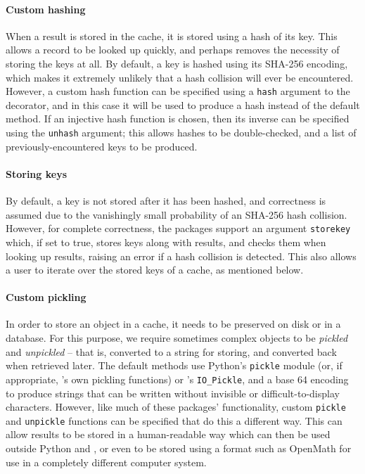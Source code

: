 \documentclass{deliverablereport}
\begin{document}
\paragraph{Custom hashing}
When a result is stored in the cache, it is stored using a hash of its key.
This allows a record to be looked up quickly, and perhaps removes the necessity
of storing the keys at all.  By default, a key is hashed using its SHA-256
encoding, which makes it extremely unlikely that a hash collision will ever be
encountered.  However, a custom hash function can be specified using a
\texttt{hash} argument to the decorator, and in this case it will be used to
produce a hash instead of the default method.  If an injective hash function is
chosen, then its inverse can be specified using the \texttt{unhash} argument;
this allows hashes to be double-checked, and a list of previously-encountered
keys to be produced.

\paragraph{Storing keys}
By default, a key is not stored after it has been hashed, and correctness is
assumed due to the vanishingly small probability of an SHA-256 hash collision.
However, for complete correctness, the packages support an argument
\texttt{storekey} which, if set to true, stores keys along with results, and
checks them when looking up results, raising an error if a hash collision is
detected.  This also allows a user to iterate over the stored keys of a cache,
as mentioned below.

\paragraph{Custom pickling}
In order to store an object in a cache, it needs to be preserved on disk or in a
database.  For this purpose, we require sometimes complex objects to be
\textit{pickled} and \textit{unpickled} -- that is, converted to a string for
storing, and converted back when retrieved later.  The default methods use
Python's \texttt{pickle} module (or, if appropriate, \Sage's own pickling
functions) or \GAP's \texttt{IO\_Pickle}, and a base 64 encoding to produce strings that
can be written without invisible or difficult-to-display characters.  However,
like much of these packages' functionality, custom \texttt{pickle} and
\texttt{unpickle} functions can be specified that do this a different way.  This
can allow results to be stored in a human-readable way which can then be used
outside Python and \GAP, or even to be stored using a format such as OpenMath for use in
a completely different computer system.
\end{document}
